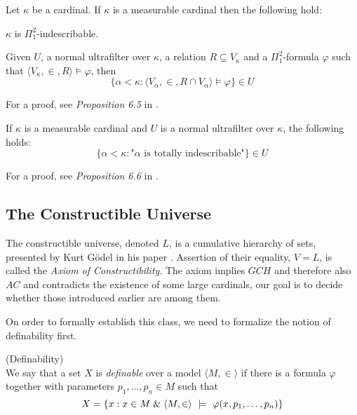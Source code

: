 \begin{theorem}
Let $\kappa$ be a cardinal. If $\kappa$ is a measurable cardinal then the following hold:
\bce[(i)]
\item $\kappa$ is $\Pi^2_1$-indescribable.
\item Given $U$, a normal ultrafilter over $\kappa$, a relation $R \subseteq V_\kappa$ and a $\Pi^2_1$-formula $\varphi$ such that $\langle V_\kappa, \in, R \rangle \models \varphi$, then
\begin{equation}
\{ \alpha < \kappa : \langle V_\alpha, \in, R \cap V_\alpha \rangle \models \varphi \} \in U
\end{equation}
\ece
\end{theorem}
For a proof, see \emph{Proposition 6.5} in \cite{KanamoriBook}.

\begin{theorem}
If $\kappa$ is a measurable cardinal and $U$ is a normal ultrafilter over $\kappa$, the following holds:
\begin{equation}
\{ \alpha < \kappa: \mbox{"$\alpha$ is totally indescribable"}\} \in U
\end{equation}
\end{theorem}
For a proof, see \emph{Proposition 6.6} in \cite{KanamoriBook}.



\subsection{The Constructible Universe}

The constructible universe, denoted $L$, is a cumulative hierarchy of sets, presented by Kurt Gödel in his paper \cite{Godel1940consistency}.
Assertion of their equality, $V=L$, is called the \emph{Axiom of Constructibility}. The axiom implies $GCH$ and therefore also $AC$ and contradicts the existence of some large cardinals, our goal is to decide whether those introduced earlier are among them.

On order to formally establish this class, we need to formalize the notion of definability first. 
\begin{definition}{(Definability)}\label{def:definability}\\ %
We say that a set $X$ is \emph{definable} over a model $\langle M, \in \rangle$ if there is a formula $\varphi$ together with parameters $p_1, \ldots, p_n \in M$ such that
\begin{equation}
X = \{x: x \in M \mathrel{\&} \langle M, \in \rangle~\models~\varphi(x, p_1, \ldots, p_n)\}
\end{equation}
\end{definition}

